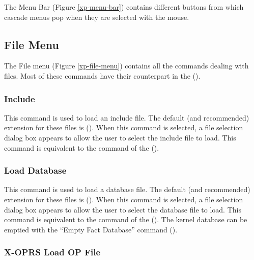 
The Menu Bar (Figure \ref{xp-menu-bar}) contains different buttons from which
cascade menus pop when they are selected with the mouse.



\subsection{File Menu}


The File menu (Figure \ref{xp-file-menu}) contains all the commands dealing
with files. Most of these commands have their counterpart in the \CPK{}
().



\subsubsection{Include}

This command is used to load an include file. The default (and recommended)
extension for these files is  (). When
this command is selected, a file selection dialog box appears to allow the user
to select the include file to load. This command is equivalent to the
 command of the \CPK{} ().

\subsubsection{Load Database}

This command is used to load a database file. The default (and recommended)
extension for these files is  (). When this
command is selected, a file selection dialog box appears to allow the user to
select the database file to load. This command is equivalent to the
 command of the \CPK{} ().
The kernel database can be emptied with the ``Empty Fact Database'' command
().

\subsubsection{X-OPRS Load OP File}

